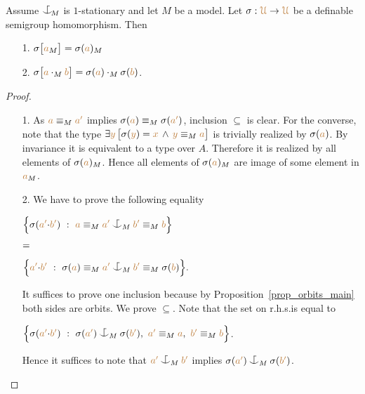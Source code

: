 \documentclass[creche.tex]{subfiles}
\begin{document}
\begin{proposition}\label{prop_HJ_tecnical}
Assume $\nonforkc_{\!M}$ is $1$-stationary and let $M$ be a model.
Let $\sigma:{\color{brown}\EuScript U}\to{\color{brown}\EuScript U}$ be a definable semigroup homomorphism.
Then 
\begin{itemize}
\item[1.] $\sigma\big[{\color{brown} a}_M\big]=\sigma({\color{brown} a})_M$

\item[2.]
$\sigma\big[{\color{brown} a}\cdot_M{\color{brown} b}\big]=\sigma({\color{brown} a})\cdot_M\sigma({\color{brown} b})$.
\end{itemize}
\end{proposition}
\begin{proof}\noindent
\begin{itemize}
\item[1.]
As ${\color{brown} a}\equiv_M{\color{brown} a'}$ implies $\sigma({\color{brown} a})\equiv_M\sigma({\color{brown} a'})$,
inclusion $\subseteq$ is clear. 
For the converse, note that the type 
$\exists{\color{brown}y}\,\big[\sigma({\color{brown} y})={\color{brown} x}\,\wedge\,{\color{brown} y}\equiv_M{\color{brown} a}\big]$ 
is trivially realized by $\sigma({\color{brown} a})$.
By invariance it is equivalent to a type over $A$.
Therefore it is realized by all elements of $\sigma({\color{brown} a})_M$.
Hence all elements of $\sigma({\color{brown} a})_M$ are image of some element in ${\color{brown} a}_M$.

\def\medrel#1{\parbox[t]{6ex}{$\displaystyle\hfil #1$}}
\def\ceq#1#2#3{\parbox[t]{33ex}{$\displaystyle #1$}\medrel{#2}{$\displaystyle #3$}}
\item[2.] We have to prove the following equality\smallskip

\ceq{\hfill\Big\{\sigma({\mr a'}{\cdot}{\mr b'})\ :\ {\mr a}\equiv_M{\mr a'}\nonforkc_M{\mr b'}\equiv_M{\mr b} \Big\}}
{=}
{\Big\{{\mr a'}{\cdot}{\mr b'}\ :\ \sigma({\mr a})\equiv_M{\mr a'}\nonforkc_M{\mr b'}\equiv_M\sigma({\mr b}) \Big\}.}\smallskip

It suffices to prove one inclusion because by Proposition~\ref{prop_orbits_main} both sides are orbits. 
We prove $\subseteq$. 
Note that the set on r.h.s.\@ is equal to\smallskip

\hfil$\Big\{\sigma({\mr a'}{\cdot}{\mr b'})\ :\ \sigma({\mr a'})\nonforkc_M\sigma({\mr b'}),\ {\mr a'}\equiv_M{\mr a},\  {\mr b'}\equiv_M{\mr b} \Big\}$.\smallskip

Hence it suffices to note that ${\mr a'}\nonforkc_M{\mr b'}$ implies $\sigma({\mr a'})\nonforkc_M\sigma({\mr b'})$.
\end{itemize}\baselineskip
\end{proof}
\end{document}
